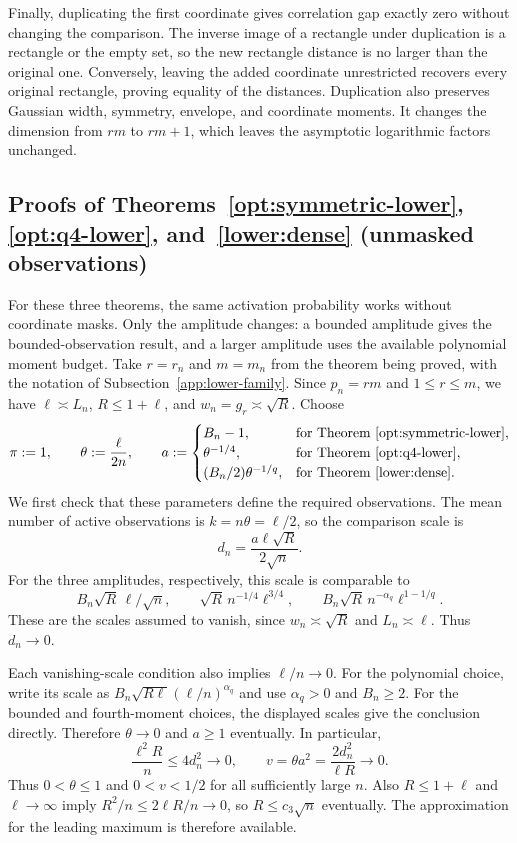 \documentclass[11pt,letterpaper]{article}
\theoremstyle{remark}
\begin{document}
Finally, duplicating the first coordinate gives correlation gap
exactly zero without changing the comparison. The inverse image
of a rectangle under duplication is a rectangle or the empty set,
so the new rectangle distance is no larger than the original one.
Conversely, leaving the added coordinate unrestricted recovers
every original rectangle, proving equality of the distances.
Duplication also preserves Gaussian width, symmetry, envelope,
and coordinate moments. It changes the dimension from $rm$ to
$rm+1$, which leaves the asymptotic logarithmic factors unchanged.

\subsection{Proofs of Theorems~\ref*{opt:symmetric-lower}, \ref*{opt:q4-lower}, and~\ref*{lower:dense} (unmasked observations)}
\label{app:symmetric-lower}

For these three theorems, the same activation probability works
without coordinate masks. Only the amplitude changes: a bounded
amplitude gives the bounded-observation result, and a larger
amplitude uses the available polynomial moment budget.
Take $r=r_n$ and $m=m_n$ from the theorem being proved, with
the notation of Subsection~\ref{app:lower-family}. Since
$p_n=rm$ and $1\le r\le m$, we have
$\ell\asymp L_n$, $R\le1+\ell$, and
$w_n=g_r\asymp\sqrt R$. Choose
\[
 \pi:=1,\qquad \theta:=\frac{\ell}{2n},\qquad
 a:=\begin{cases}
 B_n-1,&\text{for Theorem~\ref{opt:symmetric-lower}},\\
 \theta^{-1/4},&\text{for Theorem~\ref{opt:q4-lower}},\\
 (B_n/2)\theta^{-1/q},&\text{for Theorem~\ref{lower:dense}}.
 \end{cases}
\]
We first check that these parameters define the required observations.
The mean number of active observations is $k=n\theta=\ell/2$,
so the comparison scale is
\[
 d_n=\frac{a\ell\sqrt R}{2\sqrt n}.
\]
For the three amplitudes, respectively, this scale is comparable to
\[
 B_n\sqrt R\,\ell/\sqrt n,\qquad
 \sqrt R\,n^{-1/4}\ell^{3/4},\qquad
 B_n\sqrt R\,n^{-\alpha_q}\ell^{1-1/q}.
\]
These are the scales assumed to vanish, since
$w_n\asymp\sqrt R$ and $L_n\asymp\ell$. Thus $d_n\to0$.

Each vanishing-scale condition also implies $\ell/n\to0$.
For the polynomial choice, write its scale as
$B_n\sqrt{R\ell}(\ell/n)^{\alpha_q}$ and use
$\alpha_q>0$ and $B_n\ge2$. For the bounded and fourth-moment
choices, the displayed scales give the conclusion directly.
Therefore $\theta\to0$ and $a\ge1$ eventually. In particular,
\[
 \frac{\ell^2R}{n}\le4d_n^2\to0,\qquad
 v=\theta a^2=\frac{2d_n^2}{\ell R}\to0.
\]
Thus $0<\theta\le1$ and $0<v<1/2$ for all sufficiently large
$n$. Also $R\le1+\ell$ and $\ell\to\infty$ imply
$R^2/n\le2\ell R/n\to0$, so $R\le c_3\sqrt n$ eventually.
The approximation for the leading maximum is therefore available.
\end{document}
